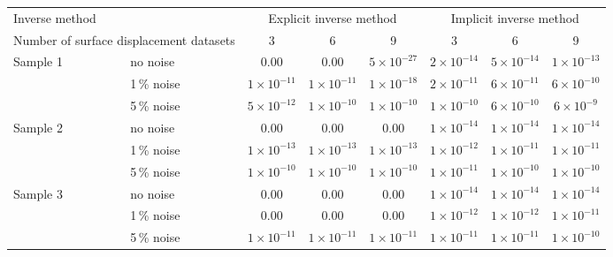 \documentclass[11pt]{article}
\begin{document}
\begin{center}
\footnotesize
\begin{tabular}{@{}ll ccc ccc@{}}
\toprule
\multicolumn{2}{l}{Inverse method}
  & \multicolumn{3}{c}{Explicit inverse method}
  & \multicolumn{3}{c}{Implicit inverse method} \\
\cmidrule(lr){3-5}\cmidrule(lr){6-8}
\multicolumn{2}{l}{Number of surface displacement datasets}
  & 3 & 6 & 9 & 3 & 6 & 9 \\
\midrule
\multirow{3}{*}{Sample 1}
  & no noise  & 0.00            & 0.00            & $5\times 10^{-27}$ & $2\times 10^{-14}$ & $5\times 10^{-14}$ & $1\times 10^{-13}$ \\
  & 1\,\% noise & $1\times 10^{-11}$ & $1\times 10^{-11}$ & $1\times 10^{-18}$ & $2\times 10^{-11}$ & $6\times 10^{-11}$ & $6\times 10^{-10}$ \\
  & 5\,\% noise & $5\times 10^{-12}$ & $1\times 10^{-10}$ & $1\times 10^{-10}$ & $1\times 10^{-10}$ & $6\times 10^{-10}$ & $6\times 10^{-9}$  \\
\midrule
\multirow{3}{*}{Sample 2}
  & no noise  & 0.00            & 0.00            & 0.00            & $1\times 10^{-14}$ & $1\times 10^{-14}$ & $1\times 10^{-14}$ \\
  & 1\,\% noise & $1\times 10^{-13}$ & $1\times 10^{-13}$ & $1\times 10^{-13}$ & $1\times 10^{-12}$ & $1\times 10^{-11}$ & $1\times 10^{-11}$ \\
  & 5\,\% noise & $1\times 10^{-10}$ & $1\times 10^{-10}$ & $1\times 10^{-10}$ & $1\times 10^{-11}$ & $1\times 10^{-10}$ & $1\times 10^{-10}$ \\
\midrule
\multirow{3}{*}{Sample 3}
  & no noise  & 0.00            & 0.00            & 0.00            & $1\times 10^{-14}$ & $1\times 10^{-14}$ & $1\times 10^{-14}$ \\
  & 1\,\% noise & 0.00            & 0.00            & 0.00            & $1\times 10^{-12}$ & $1\times 10^{-12}$ & $1\times 10^{-11}$ \\
  & 5\,\% noise & $1\times 10^{-11}$ & $1\times 10^{-11}$ & $1\times 10^{-11}$ & $1\times 10^{-11}$ & $1\times 10^{-11}$ & $1\times 10^{-10}$ \\
\bottomrule
\end{tabular}
\end{center}

\vspace{1em}
\end{document}
